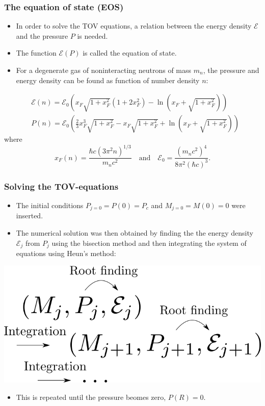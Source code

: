\documentclass{beamer}
\begin{document}
\begin{frame}
\frametitle{The equation of state (EOS)}
\begin{itemize}
    \item In order to solve the TOV equations, a relation between the energy density $\mathcal{E}$ and the pressure $P$ is needed. 
    \item The function $\mathcal{E}(P)$ is called the equation of state.
    \item For a degenerate gas of noninteracting neutrons of mass $m_n$, the pressure and energy density can be found as function of number density $n$:
\end{itemize}
\begin{equation*}
    \begin{split}
        &\mathcal{E}(n) = \mathcal{E}_0\left(x_F\sqrt{1+x_F^2}\left(1+2x_F^2\right)-\ln\left(x_F+\sqrt{1+x_F^2}\right)\right) \\ 
        &P(n) = \mathcal{E}_0\left(\frac{2}{3}x_F^3\sqrt{1+x_F^2}-x_F\sqrt{1+x_F^2}+\ln\left(x_F+\sqrt{1+x_F^2}\right)\right)
    \end{split}
\end{equation*}
where 
\begin{equation*}
    x_F(n) = \frac{\hbar c(3\pi^2n)^{1/3}}{m_nc^2} \quad \text{and} \quad \mathcal{E}_0 = \frac{(m_nc^2)^4}{8\pi^2(\hbar c)^3}.
\end{equation*}
\end{frame}
\begin{frame}
\frametitle{Solving the TOV-equations}
\begin{itemize}
    \item The initial conditions $P_{j=0} = P(0) = P_c$ and $M_{j=0} = M(0) = 0$ were inserted.
    \item The numerical solution was then obtained by finding the the energy density $\mathcal{E}_j$ from $P_j$ using the bisection method and then integrating the system of equations using Heun's method:
\end{itemize}
\begin{center}
    \includegraphics[scale=0.35]{Numerical_scheme.png}
\end{center}
\begin{itemize}
    \item This is repeated until the pressure beomes zero, $P(R) = 0$.
\end{itemize}
\end{frame}
\end{document}
